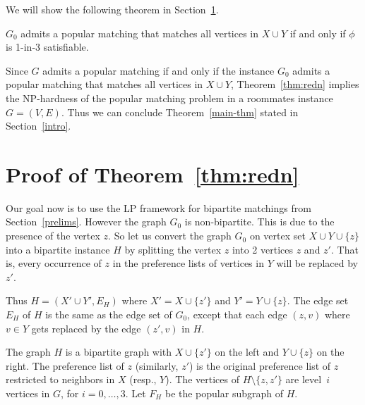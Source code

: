 \documentclass{llncs}
\begin{document}
We will show the following theorem in Section~\ref{sec:thm3-proof}.

\begin{theorem}
  \label{thm:redn}
  $G_0$ admits a popular matching that matches all vertices in $X \cup Y$ if and only if $\phi$ is 1-in-3 satisfiable.
\end{theorem}  

Since $G$ admits a popular matching if and only if the instance $G_0$ admits a popular matching that matches all vertices in
$X \cup Y$,
Theorem~\ref{thm:redn} implies the NP-hardness of the popular matching problem in a roommates instance $G = (V,E)$. Thus we can
conclude Theorem~\ref{main-thm} stated in Section~\ref{intro}.


\section{Proof of Theorem~\ref{thm:redn}}
\label{sec:thm3-proof}

Our goal now is to use the LP framework for bipartite matchings from Section~\ref{prelims}. However the graph $G_0$ is non-bipartite.
This is due to the presence of the vertex $z$. So let us convert the graph $G_0$ on vertex set $X \cup Y \cup \{z\}$ into a bipartite instance
$H$ by splitting the vertex $z$ into 2 vertices $z$ and $z'$.
That is, every occurrence of $z$ in the preference lists of vertices in $Y$ will be replaced by $z'$.

Thus $H = (X'\cup Y', E_H)$ where $X' = X \cup \{z'\}$ and $Y' = Y \cup \{z\}$. The edge set $E_H$ of $H$ is the same as the edge set of $G_0$,
except that each edge $(z,v)$ where $v \in Y $ gets replaced by the edge $(z',v)$ in $H$.

The graph $H$ is a bipartite graph with $X \cup \{z'\}$ on the left and $Y\cup\{z\}$ on the right.
The preference list of $z$ (similarly, $z'$) is the original preference list of $z$ restricted to neighbors in $X$ (resp., $Y$).
The vertices of $H \setminus \{z,z'\}$ are level~$i$ vertices in $G$, for $i = 0,\ldots,3$. Let $F_H$ be the popular subgraph of $H$.
\end{document}

